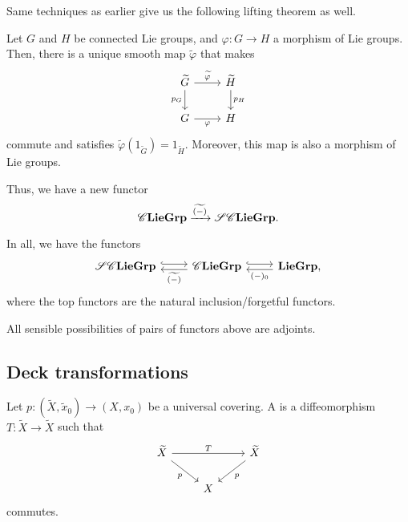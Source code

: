 \documentclass[12pt]{article}
\begin{document}
Same techniques as earlier give us the following lifting theorem as well.

\begin{thm}
	Let $G$ and $H$ be connected Lie groups, and $\varphi \colon G \to H$ a morphism of Lie groups. 
	Then, there is a unique smooth map $\widetilde{\varphi}$ that makes
	\begin{equation*} 
		\begin{tikzcd}
			\widetilde{G} \arrow[r, "\widetilde{\varphi}"] \arrow[d, "p_{G}"'] & \widetilde{H} \arrow[d, "p_{H}"] \\
			G \arrow[r, "\varphi"'] & H
		\end{tikzcd}
	\end{equation*}
	commute and satisfies $\widetilde{\varphi}(1_{\widetilde{G}}) = 1_{\widetilde{H}}$. \newline
	Moreover, this map is also a morphism of Lie groups.
\end{thm}

Thus, we have a new functor
\begin{equation*} 
	\mathscr{C}\mathbf{LieGrp} \xrightarrow{\widetilde{(-)}} \mathscr{S}\mathscr{C}\mathbf{LieGrp}.
\end{equation*}

In all, we have the functors
\begin{equation*} 
	\begin{tikzcd}
	{\SCLieGrp} \arrow[r, hook, shift left] & {\CLieGrp} \arrow[r, hook, shift left] \arrow[l, shift left, "\widetilde{(-)}"] & {\LieGrp} \arrow[l, shift left, "(-)_{0}"],
	\end{tikzcd}
\end{equation*}
where the top functors are the natural inclusion/forgetful functors. 

\begin{thm}
	All sensible possibilities of pairs of functors above are adjoints.
\end{thm}

\subsection{Deck transformations}

Let $p \colon (\widetilde{X}, \widetilde{x}_{0}) \to (X, x_{0})$ be a universal covering. 
A  is a diffeomorphism $T \colon \widetilde{X} \to \widetilde{X}$ such that
\begin{equation*} 
	\begin{tikzcd}
		\widetilde{X} \arrow[rr, "T"] \arrow[rd, "p"'] & & \widetilde{X} \arrow[ld, "p"] \\
		& X &
	\end{tikzcd}
\end{equation*}
commutes.
\end{document}
